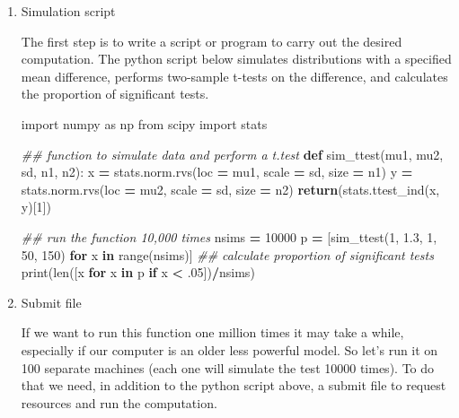 \documentclass[
]{book}
\newenvironment{Shaded}{\begin{snugshade}}{\end{snugshade}}
\newcommand{\BuiltInTok}[1]{#1}
\newcommand{\CommentTok}[1]{\textcolor[rgb]{0.56,0.35,0.01}{\textit{#1}}}
\newcommand{\ControlFlowTok}[1]{\textcolor[rgb]{0.13,0.29,0.53}{\textbf{#1}}}
\newcommand{\DecValTok}[1]{\textcolor[rgb]{0.00,0.00,0.81}{#1}}
\newcommand{\FloatTok}[1]{\textcolor[rgb]{0.00,0.00,0.81}{#1}}
\newcommand{\ImportTok}[1]{#1}
\newcommand{\KeywordTok}[1]{\textcolor[rgb]{0.13,0.29,0.53}{\textbf{#1}}}
\newcommand{\NormalTok}[1]{#1}
\newcommand{\OperatorTok}[1]{\textcolor[rgb]{0.81,0.36,0.00}{\textbf{#1}}}
\begin{document}
\begin{enumerate}
\def\labelenumi{\arabic{enumi}.}
\item
  Simulation script

  The first step is to write a script or program to carry out the
  desired computation. The python script below simulates distributions
  with a specified mean difference, performs two-sample t-tests on the
  difference, and calculates the proportion of significant tests.

\begin{Shaded}
\begin{Highlighting}[]
\ImportTok{import}\NormalTok{ numpy }\ImportTok{as}\NormalTok{ np}
\ImportTok{from}\NormalTok{ scipy }\ImportTok{import}\NormalTok{ stats}

\CommentTok{\#\# function to simulate data and perform a t.test}
\KeywordTok{def}\NormalTok{ sim\_ttest(mu1, mu2, sd, n1, n2):}
\NormalTok{    x }\OperatorTok{=}\NormalTok{ stats.norm.rvs(loc }\OperatorTok{=}\NormalTok{ mu1, scale }\OperatorTok{=}\NormalTok{ sd, size }\OperatorTok{=}\NormalTok{ n1)}
\NormalTok{    y }\OperatorTok{=}\NormalTok{ stats.norm.rvs(loc }\OperatorTok{=}\NormalTok{ mu2, scale }\OperatorTok{=}\NormalTok{ sd, size }\OperatorTok{=}\NormalTok{ n2)}
    \ControlFlowTok{return}\NormalTok{(stats.ttest\_ind(x, y)[}\DecValTok{1}\NormalTok{])}

\CommentTok{\#\#  run the function 10,000 times}
\NormalTok{nsims }\OperatorTok{=} \DecValTok{10000}
\NormalTok{p }\OperatorTok{=}\NormalTok{ [sim\_ttest(}\DecValTok{1}\NormalTok{, }\FloatTok{1.3}\NormalTok{, }\DecValTok{1}\NormalTok{, }\DecValTok{50}\NormalTok{, }\DecValTok{150}\NormalTok{)  }\ControlFlowTok{for}\NormalTok{ x }\KeywordTok{in} \BuiltInTok{range}\NormalTok{(nsims)]}
\CommentTok{\#\# calculate proportion of significant tests}
\BuiltInTok{print}\NormalTok{(}\BuiltInTok{len}\NormalTok{([x }\ControlFlowTok{for}\NormalTok{ x }\KeywordTok{in}\NormalTok{ p }\ControlFlowTok{if}\NormalTok{ x }\OperatorTok{\textless{}} \FloatTok{.05}\NormalTok{])}\OperatorTok{/}\NormalTok{nsims)}
\end{Highlighting}
\end{Shaded}
\item
  Submit file

  If we want to run this function one million times it may take a
  while, especially if our computer is an older less powerful model.
  So let's run it on 100 separate machines (each one will simulate the
  test 10000 times). To do that we need, in addition to the python
  script above, a submit file to request resources and run the
  computation.


\end{enumerate}
\end{document}
